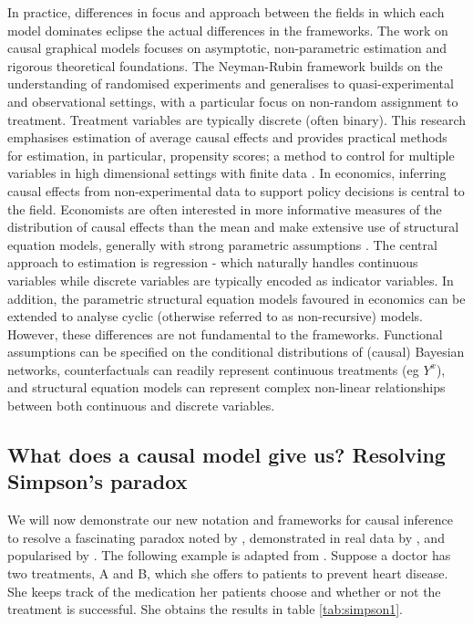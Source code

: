 \documentclass[11pt,a4paper,twoside]{report}
\newcommand{\cf}[2]{{#1}^{#2}}
\theoremstyle{plain}
\theoremstyle{definition}
\begin{document}
In practice, differences in focus and approach between the fields in which each model dominates eclipse the actual differences in the frameworks. The work on causal graphical models \citep{Pearl2000,Sprites2000} focuses on asymptotic, non-parametric estimation and rigorous theoretical foundations. The Neyman-Rubin framework builds on the understanding of randomised experiments and generalises to quasi-experimental and observational settings, with a particular focus on non-random assignment to treatment. Treatment variables are typically discrete (often binary). This research emphasises estimation of average causal effects and provides practical methods for estimation, in particular, propensity scores; a method to control for multiple variables in high dimensional settings with finite data \citep{Rosenbaum1983}. In economics, inferring causal effects from non-experimental data to support policy decisions is central to the field. Economists are often interested in more informative measures of the distribution of causal effects than the mean and make extensive use of structural equation models, generally with strong parametric assumptions \citep{Heckman2008}. The central approach to estimation is regression - which naturally handles continuous variables while discrete variables are typically encoded as indicator variables. In addition, the parametric structural equation models favoured in economics can be extended to analyse cyclic (otherwise referred to as non-recursive) models. However, these differences are not fundamental to the frameworks. Functional assumptions can be specified on the conditional distributions of (causal) Bayesian networks, counterfactuals can readily represent continuous treatments (eg $\cf{Y}{x}$), and structural equation models can represent complex non-linear relationships between both continuous and discrete variables. 

\subsection{What does a causal model give us? Resolving Simpson's paradox}

We will now demonstrate our new notation and frameworks for causal inference to resolve a fascinating paradox noted by \citet{yule1903notes}, demonstrated in real data by \citet{Cohen1934}, and popularised by \citet{simpson1951interpretation}. The following example is adapted from \citet{Pearl2000}. Suppose a doctor has two treatments, A and B, which she offers to patients to prevent heart disease. She keeps track of the medication her patients choose and whether or not the treatment is successful. She obtains the results in table \ref{tab:simpson1}.
\end{document}
